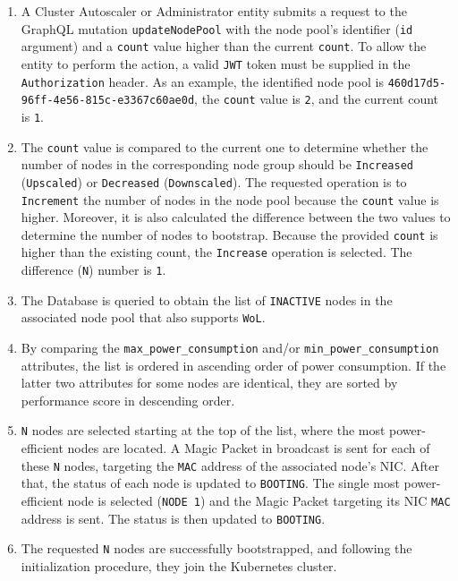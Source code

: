 \begin{enumerate}
  \item A Cluster Autoscaler or Administrator entity submits a request to the GraphQL
    mutation \texttt{updateNodePool} with the node pool's identifier (\texttt{id}
    argument) and a \texttt{count} value higher than the current \texttt{count}.
    To allow the entity to perform the action, a valid \texttt{JWT} token must
    be supplied in the \texttt{Authorization} header.
    \newline
    As an example, the identified node pool is \texttt{460d17d5-96ff-4e56-815c-e3367c60ae0d},
    the \texttt{count} value is \texttt{2}, and the current count is \texttt{1}.

  \item The \texttt{count} value is compared to the current one to determine
    whether the number of nodes in the corresponding node group should be
    \texttt{Increased} (\texttt{Upscaled}) or \texttt{Decreased} (\texttt{Downscaled}).
    The requested operation is to \texttt{Increment} the number of nodes in the
    node pool because the \texttt{count} value is higher. Moreover, it is also calculated
    the difference between the two values to determine the number of nodes to bootstrap.
    \newline
    Because the provided \texttt{count} is higher than the existing count, the
    \texttt{Increase} operation is selected. The difference (\texttt{N}) number is
    \texttt{1}.

  \item The Database is queried to obtain the list of \texttt{INACTIVE} nodes in
    the associated node pool that also supports \texttt{WoL}.

  \item By comparing the \texttt{max\_power\_consumption} and/or \texttt{min\_power\_consumption}
    attributes, the list is ordered in ascending order of power consumption. If the
    latter two attributes for some nodes are identical, they are sorted by
    performance score in descending order.

  \item \texttt{N} nodes are selected starting at the top of the list, where the
    most power-efficient nodes are located. A Magic Packet in broadcast is sent
    for each of these \texttt{N} nodes, targeting the \texttt{MAC} address of the
    associated node's NIC. After that, the status of each node is updated to \texttt{BOOTING}.
    \newline
    The single most power-efficient node is selected (\texttt{NODE 1}) and the
    Magic Packet targeting its NIC \texttt{MAC} address is sent. The status is
    then updated to \texttt{BOOTING}.

  \item The requested \texttt{N} nodes are successfully bootstrapped, and following
    the initialization procedure, they join the Kubernetes cluster.
\end{enumerate}

